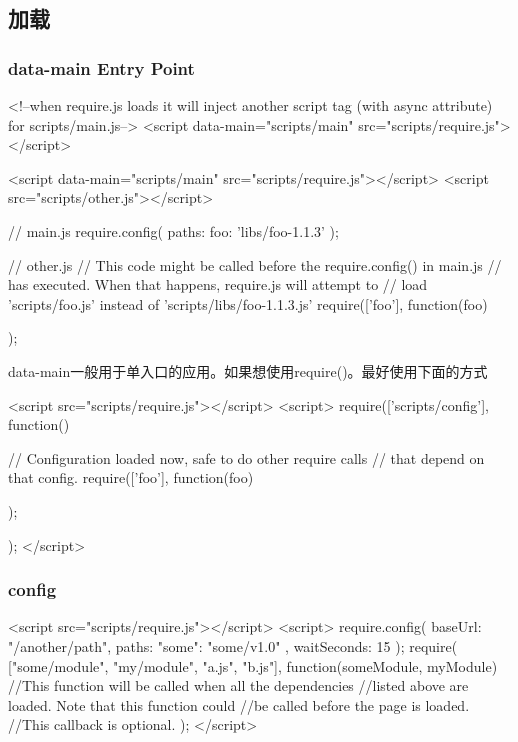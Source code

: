\subsection{加载}

\subsubsection{data-main Entry Point}

\begin{HTML5}
<!--when require.js loads it will inject another script tag
    (with async attribute) for scripts/main.js-->
<script data-main="scripts/main" src="scripts/require.js"></script>
\end{HTML5}

\begin{HTML5}
<script data-main="scripts/main" src="scripts/require.js"></script>
<script src="scripts/other.js"></script>

// main.js
require.config({
    paths: {
        foo: 'libs/foo-1.1.3'
    }
});

// other.js
// This code might be called before the require.config() in main.js
// has executed. When that happens, require.js will attempt to
// load 'scripts/foo.js' instead of 'scripts/libs/foo-1.1.3.js'
require(['foo'], function(foo) {

});
\end{HTML5}

data-main一般用于单入口的应用。如果想使用require()。最好使用下面的方式
\begin{HTML5}
<script src="scripts/require.js"></script>
<script>
require(['scripts/config'], function() {
    // Configuration loaded now, safe to do other require calls
    // that depend on that config.
    require(['foo'], function(foo) {

    });
});
</script>
\end{HTML5}

\subsubsection{config}

\begin{HTML5}
<script src="scripts/require.js"></script>
<script>
  require.config({
    baseUrl: "/another/path",
    paths: {
        "some": "some/v1.0"
    },
    waitSeconds: 15
  });
  require( ["some/module", "my/module", "a.js", "b.js"],
    function(someModule,    myModule) {
        //This function will be called when all the dependencies
        //listed above are loaded. Note that this function could
        //be called before the page is loaded.
        //This callback is optional.
    }
  );
</script>
\end{HTML5}

